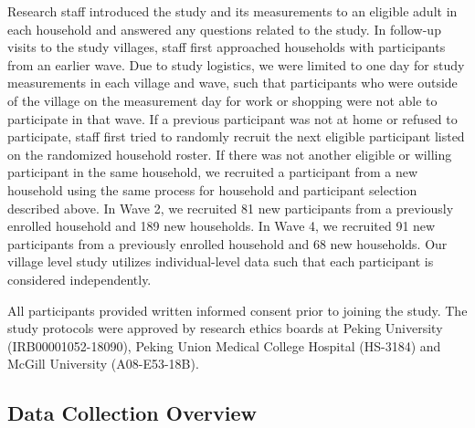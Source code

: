 \documentclass[
  letterpaper,
  DIV=11,
  numbers=noendperiod]{scrartcl}
\begin{document}
Research staff introduced the study and its measurements to an eligible
adult in each household and answered any questions related to the study.
In follow-up visits to the study villages, staff first approached
households with participants from an earlier wave. Due 
to study logistics, we were limited to one day for study measurements in
each village and wave, such that participants who were outside of the
village on the measurement day for work or shopping were not able to
participate in that wave. If a previous participant was not at home or
refused to participate, staff first tried to randomly recruit the next
eligible participant listed on the randomized household roster. If there
was not another eligible or willing participant in the same household,
we recruited a participant from a new household using the same process
for household and participant selection described above. In Wave 2, we
recruited 81 new participants from a previously enrolled household and
189 new households. In Wave 4, we recruited 91 new participants from a
previously enrolled household and 68 new households. Our village level
study utilizes individual-level data such that each participant is
considered independently.

All participants provided written informed consent prior to joining the
study. The study protocols were approved by research ethics boards at
Peking University (IRB00001052-18090), Peking Union Medical College
Hospital (HS-3184) and McGill University (A08-E53-18B).

\subsection{Data Collection Overview}\label{data-collection-overview}
\end{document}
